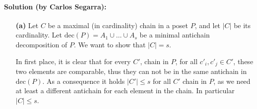 \documentclass{amsart}
\theoremstyle{plain}
\begin{document}
\paragraph{\textbf{Solution (by Carlos Segarra):}} 
\begin{enumerate}
    \item[\textbf{(a)}] 
        Let $C$ be a maximal (in cardinality) chain in a poset $P$, and let $|C|$ be its cardinality.
        Let $\text{dec}(P) = A_1 \cup \dots \cup A_s$ be a minimal antichain decomposition of $P$.
        We want to show that $|C| = s$.

        In first place, it is clear that for every $C'$, chain in $P$, for all $c'_i, c'_j \in C'$, these two elements are comparable, thus they can not be in the same antichain in $\text{dec}(P)$.
        As a consequence it holds $|C'| \leq s$ for all $C'$ chain in $P$, as we need at least a different antichain for each element in the chain.
        In particular $|C| \leq s$. 


\end{enumerate}
\end{document}
